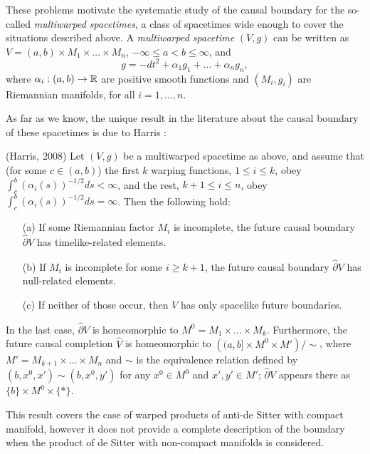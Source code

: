 \smallskip

 These problems motivate the systematic study of the causal boundary for the so-called {\em multiwarped spacetimes}, a class of spacetimes wide enough to cover the situations described above. A {\em multiwarped spacetime} $(V,g)$ can be written as $V=(a,b)\times M_1\times \dots \times M_n$, $-\infty\leq a<b\leq\infty$, and
\begin{equation}\label{eqqq}
g=-dt^2 + \alpha_1 g_1+\dots+\alpha_n g_n,
\end{equation}
where $\alpha_i:(a,b)\rightarrow{\mathbb R}$ are positive smooth functions and $(M_i,g_i)$ are Riemannian manifolds, for all $i=1,\ldots,n$.

As far as we know, the unique result in the literature about the causal boundary of these spacetimes is due to Harris \cite{H}:
\begin{thm}(Harris, 2008)\label{thm:harris}
Let $(V,g)$ be a multiwarped spacetime as above, and assume that (for some $c\in (a,b)$) the first $k$ warping functions, $1\leq i\leq k$, obey $\int_{c}^b(\alpha_i(s))^{-1/2}ds<\infty$, and the rest, $k+1\leq i\leq n$, obey $\int_{c}^b(\alpha_i(s))^{-1/2}ds=\infty$. Then the following hold:
  \begin{itemize}
  \item[(a)] If some Riemannian factor $M_i$ is incomplete, the future causal boundary $\hat{\partial} V$ has timelike-related elements.
  \item[(b)] If $M_i$ is incomplete for some $i\geq k+1$, the future causal boundary $\hat{\partial} V$ has null-related elements.
    \item[(c)] If neither of those occur, then $V$ has only spacelike future boundaries.
  \end{itemize}
In the last case, $\hat{\partial} V$ is homeomorphic to $M^0=M_1\times \dots \times M_k$. Furthermore, the future causal completion $\hat{V}$ is homeomorphic to $\left( (a,b]\times M^0\times M'\right)/\sim$, where $M'=M_{k+1}\times \dots \times M_n$ and $\sim$ is the equivalence relation defined by $(b,x^0,x')\sim (b,x^0,y')$ for any $x^0\in M^0$ and $x',y'\in M'$; $\hat{\partial} V$ appears there as $\{b\}\times M^0\times \{*\}$.
\end{thm}
\noindent This result covers the case of warped products of anti-de Sitter with compact manifold, however it does not provide a complete description of the boundary when the product of de Sitter with non-compact manifolds is considered.


